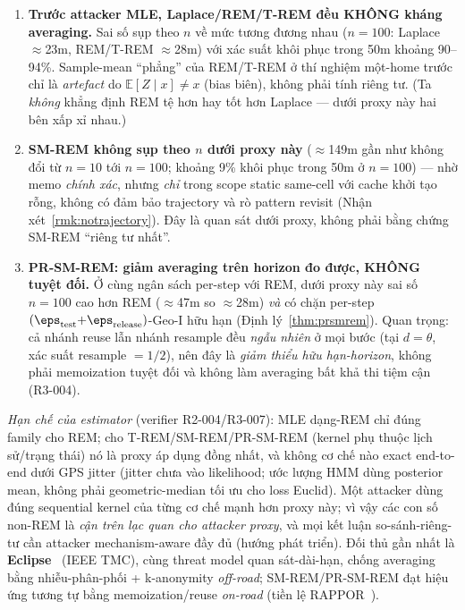 \begin{enumerate}
  \item \textbf{Trước attacker MLE, Laplace/REM/T-REM đều KHÔNG kháng averaging.}
  Sai số sụp theo $n$ về mức tương đương nhau ($n{=}100$: Laplace $\approx$23m,
  REM/T-REM $\approx$28m) với xác suất khôi phục trong 50m khoảng 90--94\%.
  Sample-mean ``phẳng'' của REM/T-REM ở thí nghiệm một-home trước chỉ là
  \emph{artefact} do $\mathbb{E}[Z\mid x]\ne x$ (bias biên), không phải tính
  riêng tư. (Ta \emph{không} khẳng định REM tệ hơn hay tốt hơn Laplace --- dưới
  proxy này hai bên xấp xỉ nhau.)
  \item \textbf{SM-REM không sụp theo $n$ dưới proxy này} ($\approx$149m gần
  như không đổi từ $n{=}10$ tới $n{=}100$; khoảng 9\% khôi phục trong 50m ở
  $n{=}100$) --- nhờ memo \emph{chính xác}, nhưng \emph{chỉ} trong scope static
  same-cell với cache khởi tạo rỗng, không có đảm bảo trajectory và rò pattern
  revisit (Nhận xét~\ref{rmk:notrajectory}). Đây là quan sát dưới proxy, không
  phải bằng chứng SM-REM ``riêng tư nhất''.
  \item \textbf{PR-SM-REM: giảm averaging trên horizon đo được, KHÔNG tuyệt đối.}
  Ở cùng ngân sách per-step với REM, dưới proxy này sai số $n{=}100$ cao hơn
  REM ($\approx$47m so $\approx$28m) \emph{và} có chặn per-step
  $(\eps_{\text{test}}{+}\eps_{\text{release}})$-Geo-I hữu hạn (Định
  lý~\ref{thm:prsmrem}). Quan trọng: cả nhánh reuse lẫn nhánh resample đều
  \emph{ngẫu nhiên} ở mọi bước (tại $d{=}\theta$, xác suất resample $=1/2$), nên
  đây là \emph{giảm thiểu hữu hạn-horizon}, không phải memoization tuyệt đối và
  không làm averaging bất khả thi tiệm cận (R3-004).
\end{enumerate}

\noindent \emph{Hạn chế của estimator} (verifier R2-004/R3-007):
\label{sec:attacker-proxy-caveat}
MLE dạng-REM chỉ đúng family cho REM; cho T-REM/SM-REM/PR-SM-REM (kernel phụ
thuộc lịch sử/trạng thái) nó là proxy áp dụng đồng nhất, và không cơ chế nào
exact end-to-end dưới GPS jitter (jitter chưa vào likelihood; ước lượng HMM dùng
posterior mean, không phải geometric-median tối ưu cho loss Euclid). Một attacker
dùng đúng sequential kernel của từng cơ chế mạnh hơn proxy này; vì vậy các con số
non-REM là \emph{cận trên lạc quan cho attacker proxy}, và mọi kết luận
so-sánh-riêng-tư cần attacker mechanism-aware đầy đủ (hướng phát triển). Đối thủ
gần nhất là
\textbf{Eclipse}~\cite{niu2020eclipse} (IEEE TMC), cùng threat model quan
sát-dài-hạn, chống averaging bằng nhiễu-phân-phối + k-anonymity \emph{off-road};
SM-REM/PR-SM-REM đạt hiệu ứng tương tự bằng memoization/reuse \emph{on-road}
(tiền lệ RAPPOR~\cite{erlingsson2014rappor}).

